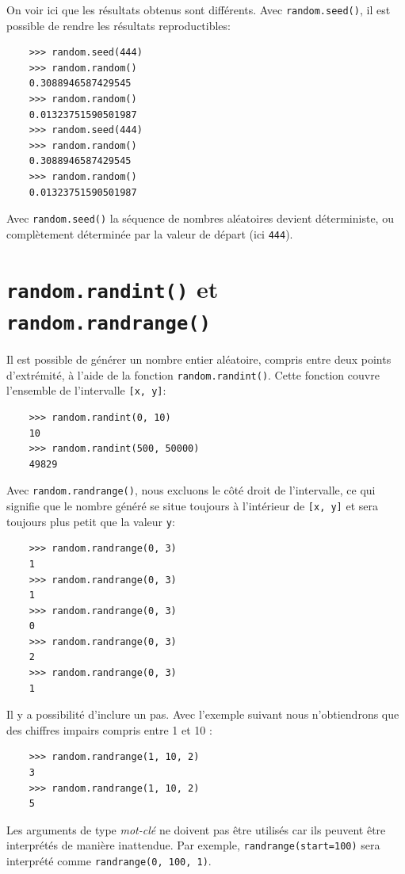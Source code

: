\documentclass[a4paper,12pt]{book}
\begin{document}
On voir ici que les résultats obtenus sont différents. Avec \texttt{random.seed()}, il est possible de rendre les résultats reproductibles:
\begin{verbatim}
    >>> random.seed(444)
    >>> random.random()
    0.3088946587429545
    >>> random.random()
    0.01323751590501987
    >>> random.seed(444)
    >>> random.random()
    0.3088946587429545
    >>> random.random()
    0.01323751590501987
\end{verbatim}
\medskip

Avec \texttt{random.seed()} la séquence de nombres aléatoires devient déterministe, ou complètement déterminée par la valeur de départ (ici \texttt{444}).

\section{\texttt{random.randint()} et \texttt{random.randrange()}}
Il est possible de générer un nombre entier aléatoire, compris entre deux points d'extrémité, à l'aide de la fonction \texttt{random.randint()}. Cette fonction couvre l'ensemble de l'intervalle \texttt{[x, y]}:
\begin{verbatim}
    >>> random.randint(0, 10)
    10
    >>> random.randint(500, 50000)
    49829
\end{verbatim}
\medskip

Avec \texttt{random.randrange()}, nous excluons le côté droit de l'intervalle, ce qui signifie que le nombre généré se situe toujours à l'intérieur de \texttt{[x, y]} et sera toujours plus petit que la valeur \texttt{y}:
\begin{verbatim}
    >>> random.randrange(0, 3)
    1
    >>> random.randrange(0, 3)
    1
    >>> random.randrange(0, 3)
    0
    >>> random.randrange(0, 3)
    2
    >>> random.randrange(0, 3)
    1
\end{verbatim}
\medskip

Il y a possibilité d'inclure un pas. Avec l'exemple suivant nous n'obtiendrons que des chiffres impairs compris entre 1 et 10 :
\begin{verbatim}
    >>> random.randrange(1, 10, 2)
    3
    >>> random.randrange(1, 10, 2)
    5
\end{verbatim}
\medskip

Les arguments de type \textit{mot-clé} ne doivent pas être utilisés car ils peuvent être interprétés de manière inattendue. Par exemple, \texttt{randrange(start=100)} sera interprété comme \texttt{randrange(0, 100, 1)}.
\medskip
\end{document}
